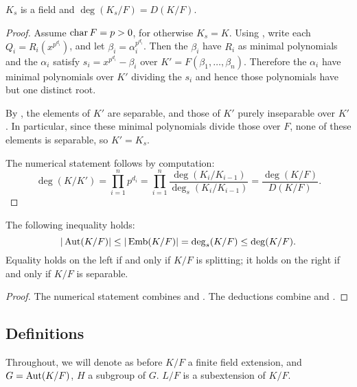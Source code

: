 \begin{corollary} $K_s$ is a field and $\deg(K_s/F) = D(K/F)$.
\label{sep_subfield}
\end{corollary}

\begin{proof} Assume $\operatorname{\text{char}}{F} = p > 0$, for otherwise $K_s = K$.  Using
, write each $Q_i = R_i(x^{p^{d_i}})$, and let $\beta_i =
\alpha_i^{p^{d_i}}$.  Then the $\beta_i$ have $R_i$ as minimal polynomials and
the $\alpha_i$ satisfy $s_i = x^{p^{d_i}} - \beta_i$ over $K' = F(\beta_1,
\dots, \beta_n)$.  Therefore the $\alpha_i$ have minimal polynomials over $K'$
dividing the $s_i$ and hence those polynomials have but one distinct root.

By , the elements of $K'$ are separable, and those of
$K'$ purely inseparable over $K'$.  In particular, since these minimal
polynomials divide those over $F$, none of these elements is separable, so $K'
= K_s$.

The numerical statement follows by computation:
\begin{equation*}
\deg(K/K') = \prod_{i = 1}^n p^{d_i}
	= \prod_{i = 1}^n \frac{\deg(K_i/K_{i - 1})}{\deg_s(K_i/K_{i - 1})}
	= \frac{\deg(K/F)}{D(K/F)}. 
	\end{equation*}
\end{proof}

\begin{theorem} The following inequality holds:
\begin{equation*}
|\operatorname{\text{Aut}}(K/F)| \leq |\operatorname{\text{Emb}}(K/F)| = \deg_s(K/F) \leq \deg(K/F).
\end{equation*}
Equality holds on the left if and only if $K/F$ is splitting; it holds on the
right if and only if $K/F$ is separable.
\label{galois_size}
\end{theorem}

\begin{proof} The numerical statement combines  and
.  The deductions combine  and
. \end{proof}

\subsection{Definitions}

Throughout, we will denote as before $K/F$ a finite field extension, and $G =
\operatorname{\text{Aut}}(K/F)$, $H$ a subgroup of $G$.  $L/F$ is a subextension of $K/F$.

